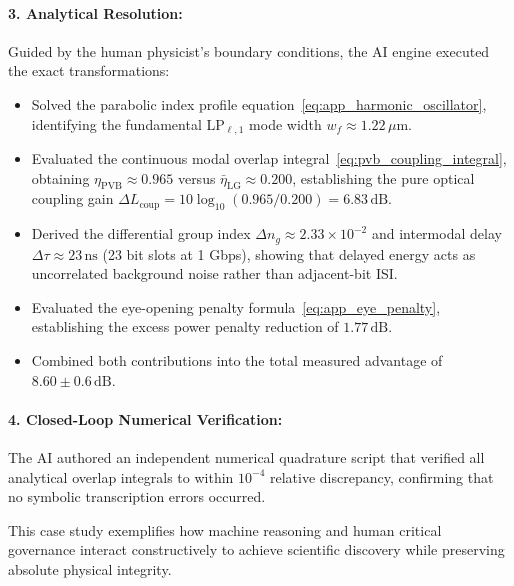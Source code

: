 \documentclass{optica-article}
\begin{document}
\paragraph{3. Analytical Resolution:}
Guided by the human physicist's boundary conditions, the AI engine executed the exact transformations:
\begin{itemize}
    \item Solved the parabolic index profile equation~\eqref{eq:app_harmonic_oscillator}, identifying the fundamental LP$_{\ell, 1}$ mode width $w_f \approx 1.22\,\mu\text{m}$.
    \item Evaluated the continuous modal overlap integral~\eqref{eq:pvb_coupling_integral}, obtaining $\eta_{\text{PVB}} \approx 0.965$ versus $\bar{\eta}_{\text{LG}} \approx 0.200$, establishing the pure optical coupling gain $\Delta L_{\text{coup}} = 10 \log_{10}(0.965 / 0.200) = 6.83\,\text{dB}$.
    \item Derived the differential group index $\Delta n_g \approx 2.33 \times 10^{-2}$ and intermodal delay $\Delta \tau \approx 23\,\text{ns}$ (23 bit slots at 1 Gbps), showing that delayed energy acts as uncorrelated background noise rather than adjacent-bit ISI.
    \item Evaluated the eye-opening penalty formula~\eqref{eq:app_eye_penalty}, establishing the excess power penalty reduction of $1.77\,\text{dB}$.
    \item Combined both contributions into the total measured advantage of $8.60 \pm 0.6\,\text{dB}$.
\end{itemize}

\paragraph{4. Closed-Loop Numerical Verification:}
The AI authored an independent numerical quadrature script that verified all analytical overlap integrals to within $10^{-4}$ relative discrepancy, confirming that no symbolic transcription errors occurred.

This case study exemplifies how machine reasoning and human critical governance interact constructively to achieve scientific discovery while preserving absolute physical integrity.
\end{document}
